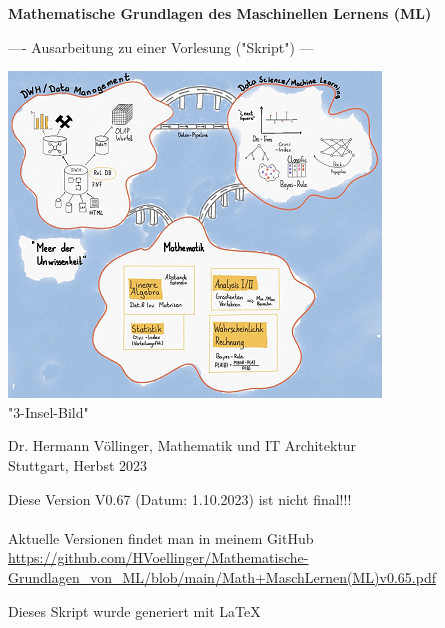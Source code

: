 \documentclass[12pt]{article}
\begin{document}

\begin{titlepage}
   \begin{center}
   \LARGE  
   \vspace{1.0cm}
       
   \textbf{Mathematische Grundlagen des Maschinellen Lernens (ML)}

   \vspace{1.0cm}
  
   \large       
   ---- Ausarbeitung zu einer Vorlesung ("Skript") ---
       
   
   \vspace{1.0cm}
   
   \includegraphics{DWH-Zeichnung}\\
   \small "3-Insel-Bild"  
       
   \vfill
   \large   
   
   Dr. Hermann Völlinger, Mathematik und IT Architektur
           \\ Stuttgart, Herbst 2023     

   \vspace{0.6cm}
        
   \end{center}
   
\begin{center}
Diese Version V0.67 (Datum: 1.10.2023) ist nicht final!!! \\
{\color{red}{(Beachte: ************ Kommentare *********)}} \\[0.3cm]
Aktuelle Versionen findet man in meinem GitHub\\[0.1cm]
\url{https://github.com/HVoellinger/Mathematische-Grundlagen_von_ML/blob/main/Math+MaschLernen(ML)v0.65.pdf} \\
\vspace{0.4cm}
\begin{large}
Dieses Skript wurde generiert mit \LaTeX\  
\end{large}
\end{center}


\end{titlepage}
\end{document}
